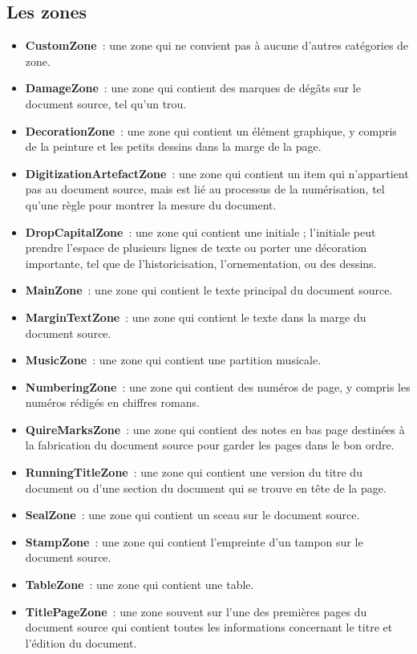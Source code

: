 \documentclass[class=article, crop=false]{standalone}
\begin{document}
\subsection{Les zones}
\begin{itemize}
\item \textbf{CustomZone}~: une zone qui ne convient pas à aucune d'autres catégories de zone.
\item \textbf{DamageZone}~: une zone qui contient des marques de dégâts sur le document source, tel qu'un trou.
\item \textbf{DecorationZone}~: une zone qui contient un élément graphique, y compris de la peinture et les petits dessins dans la marge de la page.
\item \textbf{DigitizationArtefactZone}~: une zone qui contient un item qui n'appartient pas au document source, mais est lié au processus de la numérisation, tel qu'une règle pour montrer la mesure du document. 
\item \textbf{DropCapitalZone}~: une zone qui contient une initiale ; l'initiale peut prendre l'espace de plusieurs lignes de texte ou porter une décoration importante, tel que de l'historicisation, l'ornementation, ou des dessins.
\item \textbf{MainZone}~: une zone qui contient le texte principal du document source.
\item \textbf{MarginTextZone}~: une zone qui contient le texte dans la marge du document source.
\item \textbf{MusicZone}~: une zone qui contient une partition musicale.
\item \textbf{NumberingZone}~: une zone qui contient des numéros de page, y compris les numéros rédigés en chiffres romans.
\item \textbf{QuireMarksZone}~: une zone qui contient des notes en bas page destinées à la fabrication du document source pour garder les pages dans le bon ordre.
\item \textbf{RunningTitleZone}~: une zone qui contient une version du titre du document ou d'une section du document qui se trouve en tête de la page.
\item \textbf{SealZone}~: une zone qui contient un sceau sur le document source.
\item \textbf{StampZone}~: une zone qui contient l'empreinte d'un tampon sur le document source.
\item \textbf{TableZone}~: une zone qui contient une table. 
\item \textbf{TitlePageZone}~: une zone souvent sur l'une des premières pages du document source qui contient toutes les informations concernant le titre et l'édition du document.
\end{itemize}
\end{document}
